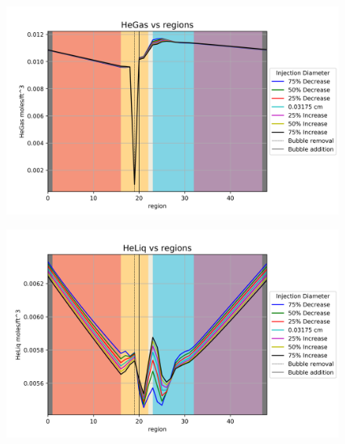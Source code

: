 \begin{figure}[p] 
\centering
\begin{minipage}{.5\textwidth}
  \centering
  \includegraphics[width=1.0\linewidth]{images/InjectedHeGas.png}
  \label{fig:InjectedHeGas}
\end{minipage}%
\begin{minipage}{.5\textwidth}
  \centering
  \includegraphics[width=1.0\linewidth]{images/InjectedHeLiq.png}
  \label{fig:InjectedHeLiq}
\end{minipage}
\end{figure}

